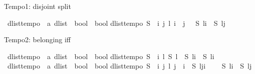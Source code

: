 \begin{isabellebody}
\begin{isamarkuptext}
Tempo1: disjoint split%
\end{isamarkuptext}\isamarkuptrue%
\isamarkupfalse%
\ dlist{\isacharunderscore}tempo{}\ {\isacharcolon}{\isacharcolon}\ {\isachardoublequoteopen}{\isacharparenleft}{\isacharprime}a\ dlist\ {\isasymRightarrow}\ bool{\isacharparenright}\ {\isasymRightarrow}\ bool{\isachardoublequoteclose}\isanewline
{}\isanewline
{\isachardoublequoteopen}dlist{\isacharunderscore}tempo{}\ S\ {\isasymequiv}\ {\isasymforall}i\ j\ l{\isachardot}\ i\ {\isasymle}\ j\ {\isasymlongrightarrow}\ {\isasymnot}\ {\isacharparenleft}{\isacharparenleft}S\ {\isacharparenleft}l{\isasymdagger}{\isachardot}{\isachardot}i{\isacharparenright}\ {\isasymand}\ S\ {\isacharparenleft}l{\isasymdagger}j{\isachardot}{\isachardot}{\isacharparenright}{\isacharparenright}{\isacharparenright}{\isachardoublequoteclose}%
\begin{isamarkuptext}%
Tempo2: belonging iff%
\end{isamarkuptext}\isamarkuptrue%
\isamarkupfalse%
\ dlist{\isacharunderscore}tempo{}\ {\isacharcolon}{\isacharcolon}\ {\isachardoublequoteopen}{\isacharparenleft}{\isacharprime}a\ dlist\ {\isasymRightarrow}\ bool{\isacharparenright}\ {\isasymRightarrow}\ bool{\isachardoublequoteclose}\isanewline
{}\isanewline
{\isachardoublequoteopen}dlist{\isacharunderscore}tempo{}\ S\ {\isasymequiv}\ {\isasymforall}i\ l{\isachardot}\ S\ l\ {\isasymlongleftrightarrow}\ {\isacharparenleft}S\ {\isacharparenleft}l{\isasymdagger}{\isachardot}{\isachardot}i{\isacharparenright}\ {\isasymor}\ S\ {\isacharparenleft}l{\isasymdagger}i{\isachardot}{\isachardot}{\isacharparenright}{\isacharparenright}{\isachardoublequoteclose}\isanewline
\isanewline
{}\isamarkupfalse%
\ dlist{\isacharunderscore}tempo{}\ {\isacharcolon}{\isacharcolon}\ {\isachardoublequoteopen}{\isacharparenleft}{\isacharprime}a\ dlist\ {\isasymRightarrow}\ bool{\isacharparenright}\ {\isasymRightarrow}\ bool{\isachardoublequoteclose}\isanewline
{}\isanewline
{\isachardoublequoteopen}dlist{\isacharunderscore}tempo{}\ S\ {\isasymequiv}\ {\isasymforall}i\ j\ l{\isachardot}\ j\ {\isacharless}\ i\ {\isasymlongrightarrow}\ {\isacharparenleft}S\ {\isacharparenleft}l{\isasymdagger}j{\isachardot}{\isachardot}i{\isacharparenright}\ {\isasymlongleftrightarrow}\ \isanewline
\ \ {\isacharparenleft}S\ {\isacharparenleft}l{\isasymdagger}{\isachardot}{\isachardot}i{\isacharparenright}\ {\isasymand}\ S\ {\isacharparenleft}l{\isasymdagger}j{\isachardot}{\isachardot}{\isacharparenright}{\isacharparenright}{\isacharparenright}{\isachardoublequoteclose}\isanewline

\end{isabellebody}
